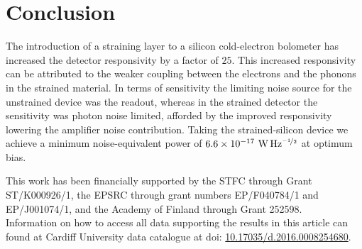 \documentclass[final]{svjour2}
\begin{document}
\section{Conclusion}
The introduction of a straining layer to a silicon cold-electron bolometer has increased the detector responsivity by a factor of $25$. This increased responsivity can be attributed to the weaker coupling between the electrons and the phonons in the strained material. In terms of sensitivity the limiting noise source for the unstrained device was the readout, whereas in the strained detector the sensitivity was photon noise limited, afforded by the improved responsivity lowering the amplifier noise contribution. Taking the strained-silicon device we achieve a minimum noise-equivalent power of $6.6 \times 10^{-17}~\mathrm{W\,Hz^{\nicefrac{-1}{2}}}$ at optimum bias.
\begin{acknowledgements}
This work has been financially supported by the STFC through Grant ST/K000926/1, the EPSRC through grant numbers EP/F040784/1 and EP/J001074/1, and the Academy of Finland through Grant 252598.
\\
Information on how to access all data supporting the results in this article can found at Cardiff University data catalogue at doi: \href{http://dx.doi.org/10.17035/d.2016.0008254680}{10.17035/d.2016.0008254680}.
\end{acknowledgements}
%
\end{document}
